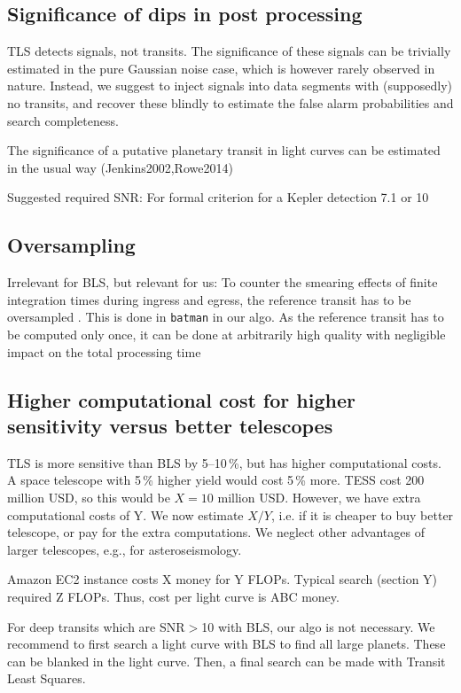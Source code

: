 \documentclass[twocolumn,tighten,longauthor]{myaastex62}
\begin{document}
\subsection{Significance of dips in post processing}
TLS detects signals, not transits. The significance of these signals can be trivially estimated in the pure Gaussian noise case, which is however rarely observed in nature. Instead, we suggest to inject signals into data segments with (supposedly) no transits, and recover these blindly to estimate the false alarm probabilities and search completeness.



The significance of a putative planetary transit in light curves can be estimated in the usual way (Jenkins2002,Rowe2014)

Suggested required SNR:
For formal criterion for a Kepler detection 7.1 \citep{2010ApJ...713L..87J}
or 10 \citep{2013ApJ...766...81F}


\subsection{Oversampling}
Irrelevant for BLS, but relevant for us: To counter the smearing effects of finite integration times during ingress and egress, the reference transit has to be oversampled \citep{2008ApJ...689..499C,2010MNRAS.408.1758K,2014ApJ...794...92P}. This is done in \texttt{batman} in our algo. As the reference transit has to be computed only once, it can be done at arbitrarily high quality with negligible impact on the total processing time


\subsection{Higher computational cost for higher sensitivity versus better telescopes}
TLS is more sensitive than BLS by 5--10\,\%, but has higher computational costs. A space telescope with 5\,\% higher yield would cost 5\,\% more. TESS cost 200 million USD, so this would be $X=10$ million USD. However, we have extra computational costs of Y. We now estimate $X/Y$, i.e. if it is cheaper to buy better telescope, or pay for the extra computations. We neglect other advantages of larger telescopes, e.g., for asteroseismology.

Amazon EC2 instance costs X money for Y FLOPs.
Typical search (section Y) required Z FLOPs.
Thus, cost per light curve is ABC money.

For deep transits which are SNR$>$10 with BLS, our algo is not necessary. We recommend to first search a light curve with BLS to find all large planets. These can be blanked in the light curve. Then, a final search can be made with Transit Least Squares.
\end{document}
